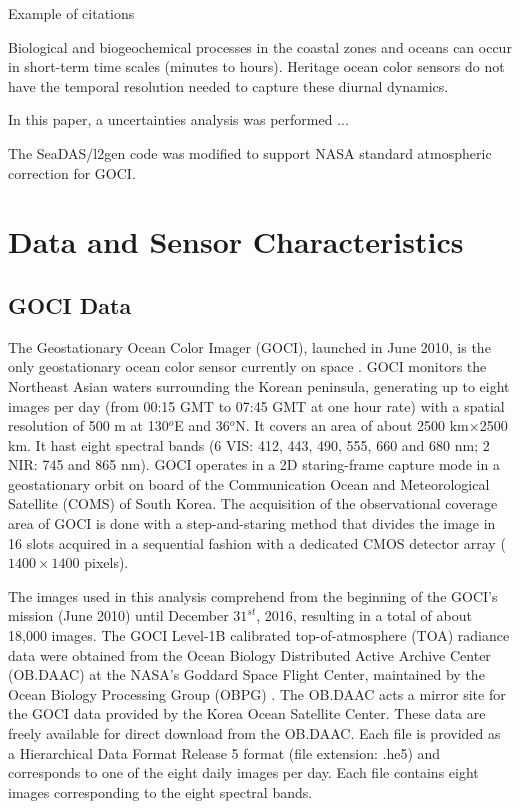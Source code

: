 \documentclass[onecolumn,3p,letterpaper,11pt]{elsarticle}
\begin{document}
Example of citations \citet{Ryu2011,He2013,Hu2016}

Biological and biogeochemical processes in the coastal zones and oceans can occur in short-term time scales (minutes to hours). Heritage ocean color sensors do not have the temporal resolution needed to capture these diurnal dynamics.

In this paper, a uncertainties analysis was performed ...

The SeaDAS/l2gen code was modified to support NASA standard atmospheric correction for GOCI.
\section{Data and Sensor Characteristics}
\subsection{GOCI Data}
The Geostationary Ocean Color Imager (GOCI), launched in June 2010, is the only geostationary ocean color sensor currently on space \citep{Ryu2012}. GOCI monitors the Northeast Asian waters surrounding the Korean peninsula, generating up to eight images per day (from 00:15 GMT to 07:45 GMT at one hour rate) with a spatial resolution of 500 m at 130$^o$E and 36$^o$N. It covers an area of about 2500 km$\times$2500 km. It hast eight spectral bands (6 VIS: 412, 443, 490, 555, 660 and 680 nm; 2 NIR: 745 and 865 nm). GOCI operates in a 2D staring-frame capture mode in a geostationary orbit on board of the Communication Ocean and Meteorological Satellite (COMS) of South Korea. The acquisition of the observational coverage area of GOCI is done with a step-and-staring method that divides the image in 16 slots acquired in a sequential fashion with a dedicated CMOS detector array ($1400\times1400$ pixels).

The images used in this analysis comprehend from the beginning of the GOCI's mission (June 2010) until December $31^{st}$, 2016, resulting in a total of about 18,000 images. The GOCI Level-1B calibrated top-of-atmosphere (TOA) radiance data were obtained from the Ocean Biology Distributed Active Archive Center (OB.DAAC) at the NASA's Goddard Space Flight Center, maintained by the Ocean Biology Processing Group (OBPG) . The OB.DAAC acts a mirror site for the GOCI data provided by the Korea Ocean Satellite Center. These data are freely available for direct download from the OB.DAAC. Each file is provided as a  Hierarchical Data Format Release 5 format (file extension: .he5) and corresponds to one of the eight daily images per day. Each file contains eight images corresponding to the eight spectral bands.
\end{document}
